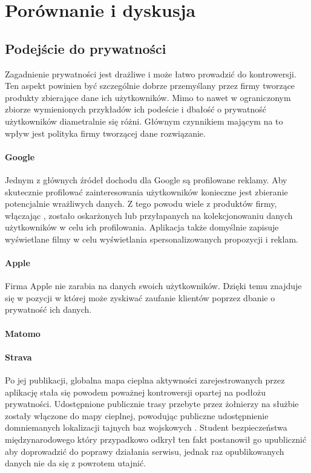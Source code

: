 \section{Porównanie i dyskusja}

\subsection{Podejście do prywatności}
Zagadnienie prywatności jest drażliwe i może łatwo prowadzić do kontrowersji. Ten aspekt powinien być szczególnie dobrze przemyślany przez firmy tworzące produkty zbierające dane ich użytkowników. Mimo to nawet w ograniczonym zbiorze wymienionych przykładów ich podeście i dbałość o prywatność użytkowników diametralnie się różni. Głównym czynnikiem mającym na to wpływ jest polityka firmy tworzącej dane rozwiązanie.

\paragraph{Google}
Jednym z głównych źródeł dochodu dla Google są profilowane reklamy. Aby skutecznie profilować zainteresowania użytkowników konieczne jest zbieranie potencjalnie wrażliwych danych. Z tego powodu wiele z produktów firmy, włączając , zostało oskarżonych lub przyłapanych na kolekcjonowaniu danych użytkowników w celu ich profilowania. Aplikacja  także domyślnie zapisuje wyświetlane filmy w celu wyświetlania spersonalizowanych propozycji i reklam.

\paragraph{Apple}
Firma Apple nie zarabia na danych swoich użytkowników. Dzięki temu znajduje się w pozycji w której może zyskiwać zaufanie klientów poprzez dbanie o prywatność ich danych. 

\paragraph{Matomo}

\paragraph{Strava}
Po jej publikacji, globalna mapa cieplna aktywności zarejestrowanych przez aplikację  stała się powodem poważnej kontrowersji opartej na podłożu prywatności. Udostępnione publicznie trasy przebyte przez żołnierzy na służbie zostały włączone do mapy cieplnej, powodując publiczne udostępnienie domniemanych lokalizacji tajnych baz wojskowych \cite{Strava_Military_Bases}. Student bezpieczeństwa międzynarodowego który przypadkowo odkrył ten fakt postanowił go upublicznić aby doprowadzić do poprawy działania serwisu, jednak raz opublikowanych danych nie da się z powrotem utajnić.


